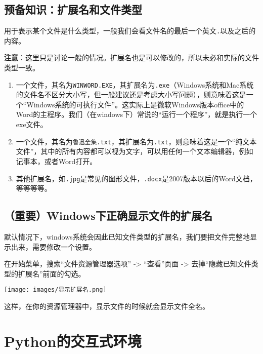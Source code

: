 \documentclass[
  letterpaper,
  DIV=11,
  numbers=noendperiod]{scrreprt}
\providecommand{\tightlist}{%
  \setlength{\itemsep}{0pt}\setlength{\parskip}{0pt}}\usepackage{longtable,booktabs,array}
\begin{document}
\hypertarget{ext_name}{%
\subsection{预备知识：扩展名和文件类型}\label{ext_name}}

用于表示某个文件是什么类型，一般我们会看文件名的最后一个英文\texttt{.}以及之后的内容。

\textbf{注意}：这里只是讨论一般的情况。扩展名也是可以修改的，所以未必和实际的文件类型一致。

\begin{enumerate}
\def\labelenumi{\arabic{enumi}.}
\tightlist
\item
  一个文件，其名为\texttt{WINWORD.EXE}，其扩展名为\texttt{.exe}（Windows系统和Mac系统的文件名不区分大小写，但一般建议还是考虑大小写问题），则意味着这是一个``Windows系统的可执行文件''。这实际上是微软Windows版本office中的Word的主程序。我们（在windows下）常说的``运行一个程序''，就是执行一个exe文件。
\item
  一个文件，其名为\texttt{鲁迅全集.txt}，其扩展名为\texttt{.txt}，则意味着这是一个``纯文本文件''，其中的所有内容都可以视为文字，可以用任何一个文本编辑器，例如记事本，或者Word打开。
\item
  其他扩展名，如\texttt{.jpg}是常见的图形文件，\texttt{.docx}是2007版本以后的Word文档，等等等等。
\end{enumerate}

\hypertarget{ux91cdux8981windowsux4e0bux6b63ux786eux663eux793aux6587ux4ef6ux7684ux6269ux5c55ux540d}{%
\subsection{（重要）Windows下正确显示文件的扩展名}\label{ux91cdux8981windowsux4e0bux6b63ux786eux663eux793aux6587ux4ef6ux7684ux6269ux5c55ux540d}}

默认情况下，windows系统会因此已知文件类型的扩展名，我们要把文件完整地显示出来，需要修改一个设置。

在开始菜单，搜索``文件资源管理器选项'' -\textgreater{} ``查看''页面
-\textgreater{} 去掉``隐藏已知文件类型的扩展名''前面的勾选。

\texttt{[image: images/显示扩展名.png]}

这样，在你的资源管理器中，显示文件的时候就会显示文件全名。

\hypertarget{python_interactive}{%
\section{Python的交互式环境}\label{python_interactive}}
\end{document}
